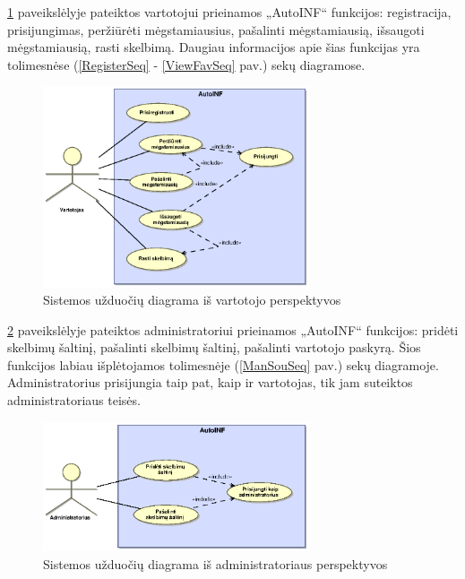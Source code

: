 \documentclass[12pt]{article}
\begin{document}
	\pagebreak

	\ref{UseCaseUser} paveikslėlyje pateiktos vartotojui prieinamos „AutoINF“ funkcijos: registracija, prisijungimas, peržiūrėti mėgstamiausius, pašalinti mėgstamiausią, išsaugoti mėgstamiausią, rasti skelbimą. Daugiau informacijos apie šias funkcijas yra tolimesnėse (\ref{RegisterSeq} - \ref{ViewFavSeq} pav.) sekų diagramose.
	
	\begin{figure}[h]
		\begin{center}
			\includegraphics[width=0.7\textwidth]{TikslaiVartotojas.eps}
			\caption{Sistemos užduočių diagrama iš vartotojo perspektyvos\label{UseCaseUser}}
		\end{center}
	\end{figure}
	
	\pagebreak	
	
	\ref{UseCaseAdmin} paveikslėlyje pateiktos administratoriui prieinamos „AutoINF“ funkcijos: pridėti skelbimų šaltinį, pašalinti skelbimų šaltinį, pašalinti vartotojo paskyrą. Šios funkcijos labiau išplėtojamos tolimesnėje (\ref{ManSouSeq} pav.) sekų diagramoje. Administratorius prisijungia taip pat, kaip ir vartotojas, tik jam suteiktos administratoriaus teisės.	
	
	\begin{figure}[h]
		\begin{center}
			\includegraphics[width=0.7\textwidth]{TikslaiAdministratorius.eps}
			\caption{Sistemos užduočių diagrama iš administratoriaus perspektyvos\label{UseCaseAdmin}}
		\end{center}
	\end{figure}	
	
\end{document}
